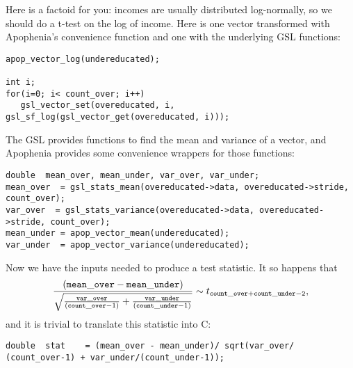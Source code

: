 Here is a factoid for you: incomes are usually distributed log-normally, so we should do a t-test on the
log of income. Here is one  vector transformed with Apophenia's convenience function and one with the underlying GSL functions: 
\begin{lstlisting}
apop_vector_log(undereducated);

int i;
for(i=0; i< count_over; i++)
   gsl_vector_set(overeducated, i, gsl_sf_log(gsl_vector_get(overeducated, i)));
\end{lstlisting}

The GSL 
provides functions to find the mean and variance of a vector, and 
Apophenia provides some convenience wrappers for those functions:

\begin{lstlisting}
double	mean_over, mean_under, var_over, var_under;
mean_over  = gsl_stats_mean(overeducated->data, overeducated->stride,
count_over);
var_over  = gsl_stats_variance(overeducated->data, overeducated->stride, count_over);
mean_under = apop_vector_mean(undereducated);
var_under  = apop_vector_variance(undereducated);
\end{lstlisting}

Now we have the inputs needed to produce a test statistic. It so happens
that 
$$
\frac{({\tt mean\_over - mean\_under})}
{\sqrt{\frac{{\tt var\_over}}{({\tt count\_over}-1)}+ \frac{{\tt var\_under}}{({\tt count\_under}-1)}}} \sim t_{\tt count\_over + count\_under - 2},
$$
and it is trivial to translate this statistic into C: 
\begin{lstlisting}
double	stat    = (mean_over - mean_under)/ sqrt(var_over/ (count_over-1) + var_under/(count_under-1));
\end{lstlisting}

